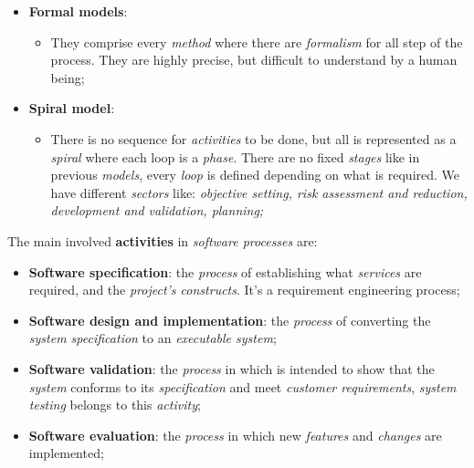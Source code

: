 \documentclass{article}
\begin{document}
\begin{itemize}
\item \textbf{Formal models}:
\begin{itemize}
\item They comprise every \emph{method} where there are \emph{formalism} for all step of the process. They are highly precise, but difficult to understand by a human being;
\end{itemize}
\pagebreak
\item \textbf{Spiral model}:
\begin{itemize}
\item There is no sequence for \emph{activities} to be done, but all is represented as a \emph{spiral} where each loop is a \emph{phase}. There are no fixed \emph{stages} like in previous \emph{models}, every \emph{loop} is defined depending on what is required. We have different \emph{sectors} like: \emph{objective setting, risk assessment and reduction, development and validation, planning; }
\end{itemize}
\end{itemize}
The main involved \textbf{activities} in \emph{software processes} are:
\begin{itemize}
\item \textbf{Software specification}: the \emph{process} of establishing what \emph{services} are required, and the \emph{project's constructs}. It's a requirement engineering process;
\item \textbf{Software design and implementation}: the \emph{process} of converting the \emph{system specification} to an \emph{executable system};
\item \textbf{Software validation}: the \emph{process} in which is intended to show that the \emph{system} conforms to its \emph{specification} and meet \emph{customer requirements}, \emph{system testing} belongs to this \emph{activity};
\item \textbf{Software evaluation}: the \emph{process} in which new \emph{features} and \emph{changes} are implemented;
\end{itemize}
\end{document}
